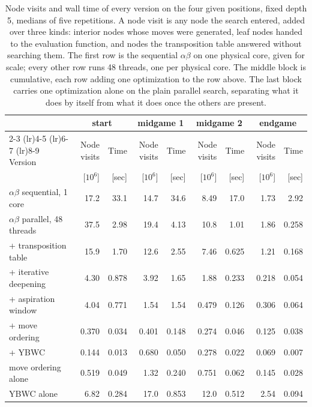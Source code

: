 \begin{table}[htbp]
\centering
\scriptsize
\setlength{\tabcolsep}{3pt}
\caption{Node visits and wall time of every version on the four given positions, fixed depth 5, medians of five repetitions. A node visit is any node the search entered, added over three kinds: interior nodes whose moves were generated, leaf nodes handed to the evaluation function, and nodes the transposition table answered without searching them. The first row is the sequential $\alpha\beta$ on one physical core, given for scale; every other row runs 48 threads, one per physical core. The middle block is cumulative, each row adding one optimization to the row above. The last block carries one optimization alone on the plain parallel search, separating what it does by itself from what it does once the others are present.}
\label{tab:abladder}
\begin{tabular}{@{}lrrrrrrrr@{}}
\toprule
 & \multicolumn{2}{c}{start} & \multicolumn{2}{c}{midgame 1} & \multicolumn{2}{c}{midgame 2} & \multicolumn{2}{c}{endgame} \\
\cmidrule(lr){2-3} \cmidrule(lr){4-5} \cmidrule(lr){6-7} \cmidrule(lr){8-9}
Version & Node visits & Time & Node visits & Time & Node visits & Time & Node visits & Time \\
 & [$10^6$] & [sec] & [$10^6$] & [sec] & [$10^6$] & [sec] & [$10^6$] & [sec] \\
\midrule
$\alpha\beta$ sequential, 1 core & 17.2 & 33.1 & 14.7 & 34.6 & 8.49 & 17.0 & 1.73 & 2.92 \\
\midrule
$\alpha\beta$ parallel, 48 threads & 37.5 & 2.98 & 19.4 & 4.13 & 10.8 & 1.01 & 1.86 & 0.258 \\
+ transposition table & 15.9 & 1.70 & 12.6 & 2.55 & 7.46 & 0.625 & 1.21 & 0.168 \\
+ iterative deepening & 4.30 & 0.878 & 3.92 & 1.65 & 1.88 & 0.233 & 0.218 & 0.054 \\
+ aspiration window & 4.04 & 0.771 & 1.54 & 1.54 & 0.479 & 0.126 & 0.306 & 0.064 \\
+ move ordering & 0.370 & 0.034 & 0.401 & 0.148 & 0.274 & 0.046 & 0.125 & 0.038 \\
+ YBWC & 0.144 & 0.013 & 0.680 & 0.050 & 0.278 & 0.022 & 0.069 & 0.007 \\
\midrule
move ordering alone & 0.519 & 0.049 & 1.32 & 0.240 & 0.751 & 0.062 & 0.145 & 0.028 \\
YBWC alone & 6.82 & 0.284 & 17.0 & 0.853 & 12.0 & 0.512 & 2.54 & 0.094 \\
\bottomrule
\end{tabular}
\end{table}

